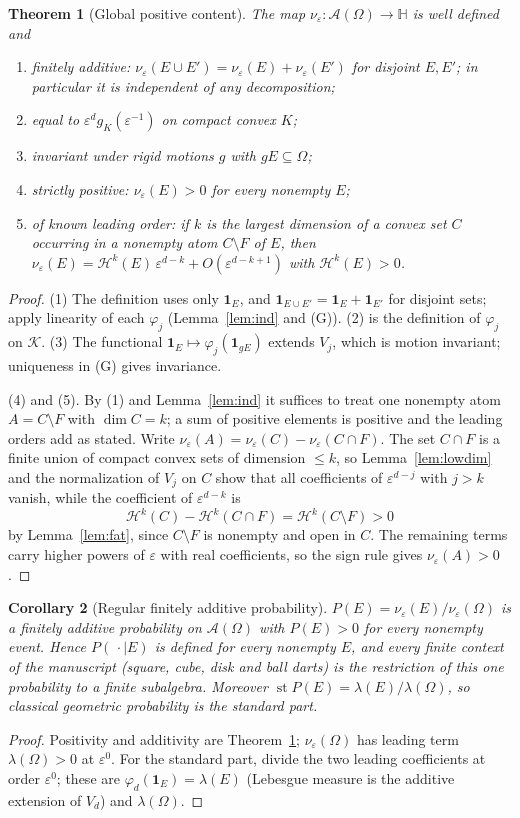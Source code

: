 \documentclass[11pt]{article}
\newtheorem{theorem}{Theorem}[section]
\newtheorem{corollary}[theorem]{Corollary}
\theoremstyle{definition}
\theoremstyle{remark}
\newcommand{\eps}{\varepsilon}
\newcommand{\HH}{\mathbb H}
\newcommand{\KK}{\mathcal K}
\newcommand{\A}{\mathcal A}
\newcommand{\Hk}{\mathcal H}
\newcommand{\nuE}{\nu_{\eps}}
\newcommand{\st}{\operatorname{st}}
\begin{document}
\begin{theorem}[Global positive content]\label{thm:global}
The map $\nuE:\A(\Omega)\to\HH$ is well defined and
\begin{enumerate}
\item finitely additive: $\nuE(E\cup E')=\nuE(E)+\nuE(E')$ for disjoint
 $E,E'$; in particular it is independent of any decomposition;
\item equal to $\eps^dg_K(\eps^{-1})$ on compact convex $K$;
\item invariant under rigid motions $g$ with $gE\subseteq\Omega$;
\item strictly positive: $\nuE(E)>0$ for every nonempty $E$;
\item of known leading order: if $k$ is the largest dimension of a convex
 set $C$ occurring in a nonempty atom $C\setminus F$ of $E$, then
 $\nuE(E)=\Hk^k(E)\,\eps^{d-k}+O(\eps^{d-k+1})$ with $\Hk^k(E)>0$.
\end{enumerate}
\end{theorem}
\begin{proof}
(1) The definition uses only $\mathbf 1_E$, and
$\mathbf 1_{E\cup E'}=\mathbf 1_E+\mathbf 1_{E'}$ for disjoint sets;
apply linearity of each $\varphi_j$ (Lemma~\ref{lem:ind} and (G)).
(2) is the definition of $\varphi_j$ on $\KK$. (3) The functional
$\mathbf 1_E\mapsto\varphi_j(\mathbf 1_{gE})$ extends $V_j$, which is
motion invariant; uniqueness in (G) gives invariance.

(4) and (5). By (1) and Lemma~\ref{lem:ind} it suffices to treat one
nonempty atom $A=C\setminus F$ with $\dim C=k$; a sum of positive
elements is positive and the leading orders add as stated. Write
$\nuE(A)=\nuE(C)-\nuE(C\cap F)$. The set $C\cap F$ is a finite union of
compact convex sets of dimension $\leq k$, so Lemma~\ref{lem:lowdim} and
the normalization of $V_j$ on $C$ show that all coefficients of
$\eps^{d-j}$ with $j>k$ vanish, while the coefficient of $\eps^{d-k}$ is
\[
 \Hk^k(C)-\Hk^k(C\cap F)=\Hk^k(C\setminus F)>0
\]
by Lemma~\ref{lem:fat}, since $C\setminus F$ is nonempty and open in $C$.
The remaining terms carry higher powers of $\eps$ with real
coefficients, so the sign rule gives $\nuE(A)>0$.
\end{proof}

\begin{corollary}[Regular finitely additive probability]
$P(E)=\nuE(E)/\nuE(\Omega)$ is a finitely additive probability on
$\A(\Omega)$ with $P(E)>0$ for every nonempty event. Hence
$P(\,\cdot\mid E)$ is defined for every nonempty $E$, and every finite
context of the manuscript (square, cube, disk and ball darts) is the
restriction of this one probability to a finite subalgebra. Moreover
$\st P(E)=\lambda(E)/\lambda(\Omega)$, so classical geometric
probability is the standard part.
\end{corollary}
\begin{proof}
Positivity and additivity are Theorem~\ref{thm:global}; $\nuE(\Omega)$
has leading term $\lambda(\Omega)>0$ at $\eps^0$. For the standard part,
divide the two leading coefficients at order $\eps^0$; these are
$\varphi_d(\mathbf 1_E)=\lambda(E)$ (Lebesgue measure is the additive
extension of $V_d$) and $\lambda(\Omega)$.
\end{proof}
\end{document}

